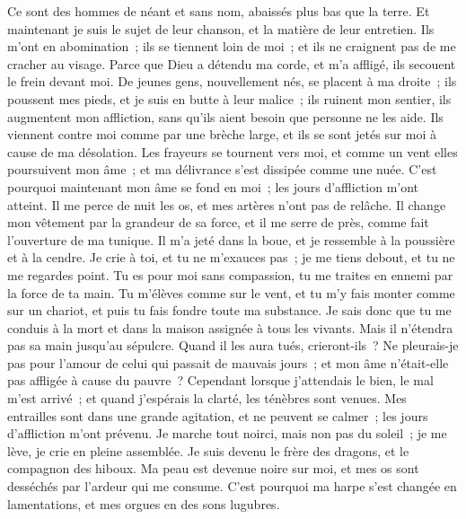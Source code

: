 \begin{multicols}{2}
Ce sont des hommes de néant et sans nom, abaissés plus bas que la terre. 
Et maintenant je suis le sujet de leur chanson, et la matière de leur entretien.
Ils m'ont en abomination~; ils se tiennent loin de moi~; et ils ne craignent pas de me cracher au visage. 
Parce que Dieu a détendu ma corde, et m'a affligé, ils secouent le frein devant moi.
De jeunes gens, nouvellement nés, se placent à ma droite~; ils poussent mes pieds, et je suis en butte à leur malice~;
ils ruinent mon sentier, ils augmentent mon affliction, sans qu'ils aient besoin que personne ne les aide.
Ils viennent contre moi comme par une brèche large, et ils se sont jetés sur moi à cause de ma désolation. 
Les frayeurs se tournent vers moi, et comme un vent elles poursuivent mon âme~; et ma délivrance s'est dissipée comme une nuée.
C'est pourquoi maintenant mon âme se fond en moi~; les jours d'affliction m'ont atteint. 
Il me perce de nuit les os, et mes artères n'ont pas de relâche. 
Il change mon vêtement par la grandeur de sa force, et il me serre de près, comme fait l'ouverture de ma tunique.
Il m'a jeté dans la boue, et je ressemble à la poussière et à la cendre. 
Je crie à toi, et tu ne m'exauces pas~; je me tiens debout, et tu ne me regardes point. 
Tu es pour moi sans compassion, tu me traites en ennemi par la force de ta main. 
Tu m'élèves comme sur le vent, et tu m'y fais monter comme sur un chariot, et puis tu fais fondre toute ma substance. 
Je sais donc que tu me conduis à la mort et dans la maison assignée à tous les vivants.
Mais il n'étendra pas sa main jusqu'au sépulcre. Quand il les aura tués, crieront-ils~? 
Ne pleurais-je pas pour l'amour de celui qui passait de mauvais jours~; et mon âme n'était-elle pas affligée à cause du pauvre~?
Cependant lorsque j'attendais le bien, le mal m'est arrivé~; et quand j'espérais la clarté, les ténèbres sont venues. 
Mes entrailles sont dans une grande agitation, et ne peuvent se calmer~; les jours d'affliction m'ont prévenu. 
Je marche tout noirci, mais non pas du soleil~; je me lève, je crie en pleine assemblée. 
Je suis devenu le frère des dragons, et le compagnon des hiboux.
Ma peau est devenue noire sur moi, et mes os sont desséchés par l'ardeur qui me consume.
C'est pourquoi ma harpe s'est changée en lamentations, et mes orgues en des sons lugubres.

\end{multicols}
